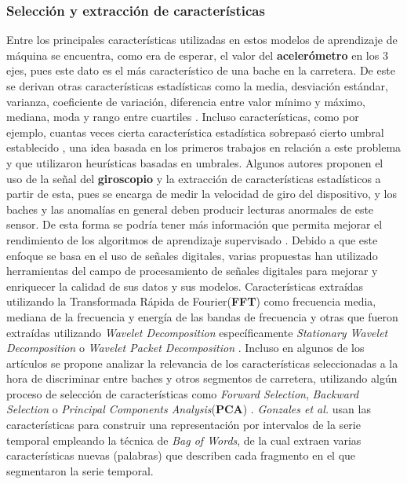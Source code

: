 		\subsubsection{Selección y extracción de características}
			Entre los principales características utilizadas en estos modelos de aprendizaje de máquina se encuentra, como era de esperar, el valor 
			del \textbf{acelerómetro} en los 3 ejes, pues este dato es el más característico de una bache en la carretera. De este se derivan otras
			características estadísticas como la media, desviación estándar, varianza, coeficiente de variación, diferencia entre valor mínimo y
			máximo, mediana, moda y rango entre cuartiles . Incluso características, como por ejemplo, cuantas veces cierta característica estadística sobrepasó cierto umbral
			establecido , una idea basada en los primeros trabajos en relación a este problema y que utilizaron
			heurísticas basadas en umbrales. Algunos autores proponen el uso de la señal del \textbf{giroscopio} y la extracción de características
			estadísticos a partir de esta, pues se encarga de medir la velocidad de giro del dispositivo, y los baches y las anomalías
			en general deben producir lecturas anormales de este sensor. De esta forma se podría tener más información que permita mejorar el
			rendimiento de los algoritmos de aprendizaje supervisado . Debido a que este enfoque
			se basa en el uso de señales digitales, varias propuestas han utilizado herramientas del campo de procesamiento de señales digitales
			para mejorar y enriquecer la calidad de sus datos y sus modelos. Características extraídas utilizando la Transformada Rápida
			de Fourier(\textbf{FFT}) como frecuencia media, mediana de la frecuencia y energía de las bandas de frecuencia  y otras que fueron extraídas utilizando \emph{Wavelet Decomposition} específicamente \emph{Stationary Wavelet
			Decomposition}  o \emph{Wavelet Packet Decomposition} . Incluso en algunos de
			los artículos se propone analizar la relevancia de los características seleccionadas a la hora de discriminar entre baches y otros
			segmentos de carretera, utilizando algún proceso de selección de características como \emph{Forward Selection}, \emph{Backward Selection}
			o \emph{Principal Components Analysis}(\textbf{PCA}) . \emph{Gonzales et al.} 
			usan las características para construir una representación por intervalos de la serie temporal empleando la técnica de \emph{Bag
			of Words}, de la cual extraen varias características nuevas (palabras) que describen cada fragmento en el que segmentaron la serie temporal.

